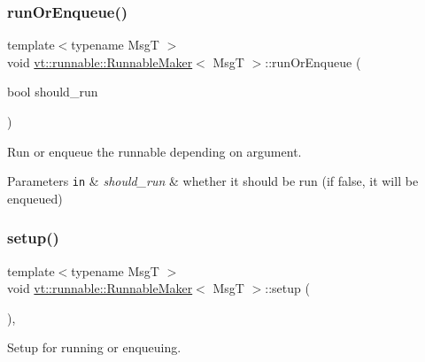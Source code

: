 \subsubsection{\texorpdfstring{run\+Or\+Enqueue()}{runOrEnqueue()}}
{\footnotesize\ttfamily template$<$typename MsgT $>$ \\
void \hyperlink{structvt_1_1runnable_1_1_runnable_maker}{vt\+::runnable\+::\+Runnable\+Maker}$<$ MsgT $>$\+::run\+Or\+Enqueue (\begin{DoxyParamCaption}\item[{bool}]{should\+\_\+run }\end{DoxyParamCaption})\hspace{0.3cm}{\ttfamily [inline]}}



Run or enqueue the runnable depending on argument. 


\begin{DoxyParams}[1]{Parameters}
\mbox{\tt in}  & {\em should\+\_\+run} & whether it should be run (if false, it will be enqueued) \\
\hline
\end{DoxyParams}
\mbox{\label{structvt_1_1runnable_1_1_runnable_maker_add114dad8a3f0769bed8b8396ba9a13a}} 
\subsubsection{\texorpdfstring{setup()}{setup()}}
{\footnotesize\ttfamily template$<$typename MsgT $>$ \\
void \hyperlink{structvt_1_1runnable_1_1_runnable_maker}{vt\+::runnable\+::\+Runnable\+Maker}$<$ MsgT $>$\+::setup (\begin{DoxyParamCaption}{ }\end{DoxyParamCaption})\hspace{0.3cm}{\ttfamily [inline]}, {\ttfamily [private]}}



Setup for running or enqueuing. 

\mbox{\label{structvt_1_1runnable_1_1_runnable_maker_aed99a9b0607da59ab7ad7ee56255fcc8}} 
